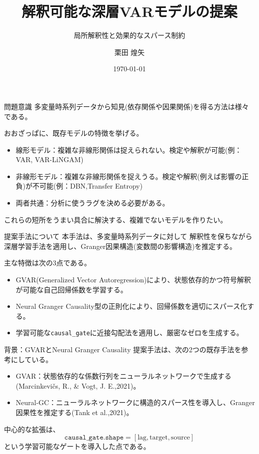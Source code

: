 \documentclass[dvipdfmx,11pt]{beamer}
\title{解釈可能な深層VARモデルの提案}
\subtitle{局所解釈性と効果的なスパース制約}
\author{栗田 煌矢}
\date{\today}
\begin{document}
\begin{frame}
  \titlepage
\end{frame}

\begin{frame}{問題意識}
  多変量時系列データから知見(依存関係や因果関係)を得る方法は様々である。
  
  おおざっぱに、既存モデルの特徴を挙げる。
  
  \begin{itemize}
    \item 線形モデル：複雑な非線形関係は捉えられない。検定や解釈が可能(例：VAR, VAR-LiNGAM)
    \item 非線形モデル：複雑な非線形関係を捉えうる。検定や解釈(例えば影響の正負)が不可能(例：DBN,Transfer Entropy)
    \item 両者共通：分析に使うラグを決める必要がある。
  \end{itemize}
  \vspace{0.5em}
  これらの短所をうまい具合に解決する、複雑でないモデルを作りたい。
\end{frame}

\begin{frame}{提案手法について}
  本手法は、多変量時系列データに対して
  解釈性を保ちながら深層学習手法を適用し、Granger因果構造(変数間の影響構造)を推定する。

  \vspace{0.5em}
  主な特徴は次の3点である。

  \begin{itemize}
    \item GVAR(Generalized Vector Autoregression)により、状態依存的かつ符号解釈が可能な自己回帰係数を学習する。
    \item Neural Granger Causality型の正則化により、回帰係数を適切にスパース化する。
    \item 学習可能な\texttt{causal\_gate}に近接勾配法を適用し、厳密なゼロを生成する。
  \end{itemize}
\end{frame}

\begin{frame}{背景：GVARとNeural Granger Causality}
  提案手法は、次の2つの既存手法を参考にしている。

  \begin{itemize}
    \item GVAR：状態依存的な係数行列をニューラルネットワークで生成する(Marcinkevičs, R., \& Vogt, J. E.,2021)。
    \item Neural-GC：ニューラルネットワークに構造的スパース性を導入し、Granger因果性を推定する(Tank et al.,2021)。
  \end{itemize}

  \vspace{0.5em}
  中心的な拡張は、
  \[
    \texttt{causal\_gate.shape} = [\text{lag}, \text{target}, \text{source}]
  \]
  という学習可能なゲートを導入した点である。
\end{frame}
\end{document}
